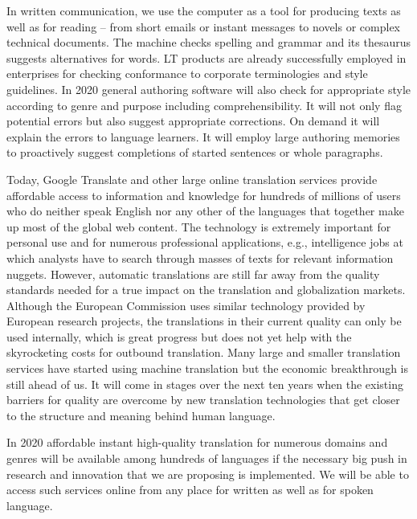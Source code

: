 \documentclass[10pt, plain]{../../metanetpaper}
\begin{document}
\begin{multicols}{2}
In written communication, we use the computer as a tool for producing texts as well as for reading – from short emails or instant messages to novels or complex technical documents. The machine checks spelling and grammar and its thesaurus suggests alternatives for words. LT products are already successfully employed in enterprises for checking conformance to corporate terminologies and style guidelines. In 2020 general authoring software will also check for appropriate style according to genre and purpose including comprehensibility. It will not only flag potential errors but also suggest appropriate corrections. On demand it will explain the errors to language learners. It will employ large authoring memories to proactively suggest completions of started sentences or whole paragraphs.
 
Today, Google Translate and other large online translation services provide affordable access to information and knowledge for hundreds of millions of users who do neither speak English nor any other of the languages that together make up most of the global web content. The technology is extremely important for personal use and for numerous professional applications, e.g., intelligence jobs at which analysts have to search through masses of texts for relevant information nuggets. However, automatic translations are still far away from the quality standards needed for a true impact on the translation and globalization markets. Although the European Commission uses similar technology provided by European research projects, the translations in their current quality can only be used internally, which is great progress but does not yet help with the skyrocketing costs for outbound translation. Many large and smaller translation services have started using machine translation but the economic breakthrough is still ahead of us. It will come in stages over the next ten years when the existing barriers for quality are overcome by new translation technologies that get closer to the structure and meaning behind human language.
 
In 2020 affordable instant high-quality translation for numerous domains and genres will be available among hundreds of languages if the necessary big push in research and innovation that we are proposing is implemented. We will be able to access such services online from any place for written as well as for spoken language.
 

\end{multicols}
\end{document}
